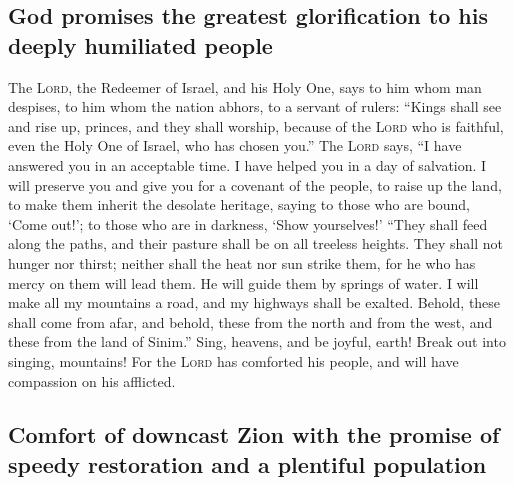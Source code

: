 \hypertarget{god-promises-the-greatest-glorification-to-his-deeply-humiliated-people}{%
\subsection{God promises the greatest glorification to his deeply
humiliated
people}\label{god-promises-the-greatest-glorification-to-his-deeply-humiliated-people}}

 The \textsc{Lord}, the Redeemer of Israel, and his Holy
One, says to him whom man despises, to him whom the nation abhors, to a
servant of rulers: ``Kings shall see and rise up, princes, and they
shall worship, because of the \textsc{Lord} who is faithful, even the
Holy One of Israel, who has chosen you.''  The
\textsc{Lord} says, ``I have answered you in an acceptable time. I have
helped you in a day of salvation. I will preserve you and give you for a
covenant of the people, to raise up the land, to make them inherit the
desolate heritage,  saying to those who are bound, `Come
out!'; to those who are in darkness, `Show yourselves!' ``They shall
feed along the paths, and their pasture shall be on all treeless
heights.  They shall not hunger nor thirst; neither shall
the heat nor sun strike them, for he who has mercy on them will lead
them. He will guide them by springs of water.  I will
make all my mountains a road, and my highways shall be exalted.
 Behold, these shall come from afar, and behold, these
from the north and from the west, and these from the land of Sinim.''
 Sing, heavens, and be joyful, earth! Break out into
singing, mountains! For the \textsc{Lord} has comforted his people, and
will have compassion on his afflicted.

\hypertarget{comfort-of-downcast-zion-with-the-promise-of-speedy-restoration-and-a-plentiful-population}{%
\subsection{Comfort of downcast Zion with the promise of speedy
restoration and a plentiful
population}\label{comfort-of-downcast-zion-with-the-promise-of-speedy-restoration-and-a-plentiful-population}}

